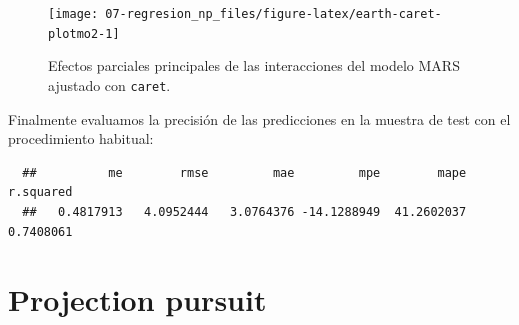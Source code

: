 \documentclass[
]{book}
\newenvironment{Shaded}{\begin{snugshade}}{\end{snugshade}}
\newcommand{\AttributeTok}[1]{\textcolor[rgb]{0.77,0.63,0.00}{#1}}
\newcommand{\DecValTok}[1]{\textcolor[rgb]{0.00,0.00,0.81}{#1}}
\newcommand{\FunctionTok}[1]{\textcolor[rgb]{0.00,0.00,0.00}{#1}}
\newcommand{\NormalTok}[1]{#1}
\newcommand{\OtherTok}[1]{\textcolor[rgb]{0.56,0.35,0.01}{#1}}
\newcommand{\SpecialCharTok}[1]{\textcolor[rgb]{0.00,0.00,0.00}{#1}}
\newcommand{\StringTok}[1]{\textcolor[rgb]{0.31,0.60,0.02}{#1}}
\theoremstyle{break}
\theoremstyle{nonumberplain}
\begin{document}
\begin{Shaded}
\end{Shaded}

\begin{figure}[!htb]

{\centering \texttt{[image: 07-regresion\_np\_files/figure-latex/earth-caret-plotmo2-1]} 

}

\caption{Efectos parciales principales de las interacciones del modelo MARS ajustado con \texttt{caret}.}\label{fig:earth-caret-plotmo2}
\end{figure}

Finalmente evaluamos la precisión de las predicciones en la muestra de test con el procedimiento habitual:

\begin{Shaded}
\end{Shaded}

\begin{verbatim}
  ##          me        rmse         mae         mpe        mape   r.squared 
  ##   0.4817913   4.0952444   3.0764376 -14.1288949  41.2602037   0.7408061
\end{verbatim}

\hypertarget{projection-pursuit}{%
\section{Projection pursuit}\label{projection-pursuit}}
\end{document}
